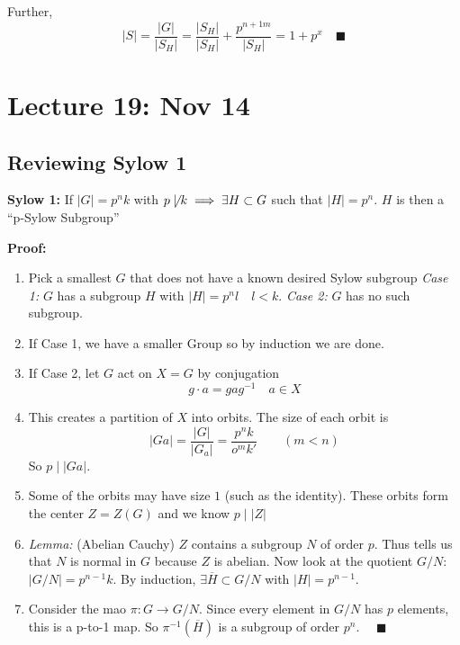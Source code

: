 \documentclass[12pt]{report}
\newcommand{\qed}{\quad \blacksquare}
\renewcommand{\indent}{\hspace*{0.5in}}
\renewcommand{\v}{\big\vert}
\newcommand{\abs}[1]{\left\vert #1 \right\vert}
\begin{document}
        Further, 
        \[\v S \v = \frac{\v G\v}{\v S_H\v} = \frac{\v S_H\v}{\v S_H\v} + \frac{p^{n+1m}}{\v S_H\v} = 1 + p^x \qed\]

\section*{Lecture 19: Nov 14}
    \subsection*{Reviewing Sylow 1}
        \textbf{Sylow 1:} If $\abs{G} = p^nk$ with $p \not \mid k \implies \exists H \subset G$ such that $\abs{H} = p^n$. $H$ is then a ``p-Sylow Subgroup''

        \textbf{Proof:} 
        \begin{enumerate}
            \item Pick a smallest $G$ that does not have a known desired Sylow subgroup
            \indent \emph{Case 1:} $G$ has a subgroup $H$ with $\abs H = p^n l \quad l < k$.
            \indent \emph{Case 2:} $G$ has no such subgroup.

            \item If Case 1, we have a smaller Group so by induction we are done. 
            \item If Case 2, let $G$ act on $X = G$ by conjugation 
            \[g\cdot a = gag^{-1} \quad a \in X\]

            \item This creates a partition of $X$ into orbits. The size of each orbit is 
            \[\abs{Ga} = \frac{\abs{G}}{\abs{G_a}} = \frac{p^nk}{o^mk'} \qquad (m <n)\]
            So $p \mid \abs{Ga}$.

            \item Some of the orbits may have size $1$ (such as the identity). These orbits form the center $Z = Z(G)$ and we know $p \mid \abs{Z}$ 
            
            \item \emph{Lemma:} (Abelian Cauchy) $Z$ contains a subgroup $N$ of order $p$. 
            Thus tells us that $N$ is normal in $G$ because $Z$ is abelian. Now look at the quotient $G/N$: $\abs{G/N} = p^{n-1}k$. By induction, $\exists \overline{H} \subset G/N$ with $\abs{H} = p^{n-1}$. 

            \item Consider the mao $\pi: G \to G/N$. Since every element in $G/N$ has $p$ elements, this is a p-to-1 map. So $\pi^{-1}(\overline{H})$ is a subgroup of order $p^n$. $\qed$
        \end{enumerate}
       
\end{document}
